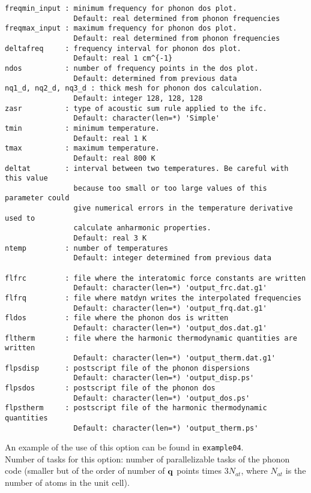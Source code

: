 \documentclass[12pt,a4paper]{article}
\begin{document}
\begin{verbatim}
freqmin_input : minimum frequency for phonon dos plot.
                Default: real determined from phonon frequencies
freqmax_input : maximum frequency for phonon dos plot.
                Default: real determined from phonon frequencies
deltafreq     : frequency interval for phonon dos plot.
                Default: real 1 cm^{-1}
ndos          : number of frequency points in the dos plot.
                Default: determined from previous data
nq1_d, nq2_d, nq3_d : thick mesh for phonon dos calculation.
                Default: integer 128, 128, 128
zasr          : type of acoustic sum rule applied to the ifc.
                Default: character(len=*) 'Simple'
tmin          : minimum temperature.
                Default: real 1 K
tmax          : maximum temperature.
                Default: real 800 K
deltat        : interval between two temperatures. Be careful with this value
                because too small or too large values of this parameter could 
                give numerical errors in the temperature derivative used to 
                calculate anharmonic properties.
                Default: real 3 K
ntemp         : number of temperatures
                Default: integer determined from previous data

flfrc         : file where the interatomic force constants are written
                Default: character(len=*) 'output_frc.dat.g1'
flfrq         : file where matdyn writes the interpolated frequencies
                Default: character(len=*) 'output_frq.dat.g1'
fldos         : file where the phonon dos is written
                Default: character(len=*) 'output_dos.dat.g1'
fltherm       : file where the harmonic thermodynamic quantities are written
                Default: character(len=*) 'output_therm.dat.g1'
flpsdisp      : postscript file of the phonon dispersions
                Default: character(len=*) 'output_disp.ps'
flpsdos       : postscript file of the phonon dos
                Default: character(len=*) 'output_dos.ps'
flpstherm     : postscript file of the harmonic thermodynamic quantities
                Default: character(len=*) 'output_therm.ps'
\end{verbatim}
An example of the use of this option can be found in \texttt{example04}. \\
Number of tasks for this option: number of parallelizable tasks of the 
phonon code (smaller but of the order of number of ${\bf q}$ points times 
$3 N_{at}$, where $N_{at}$ is the number of atoms in the unit cell).
\end{document}
